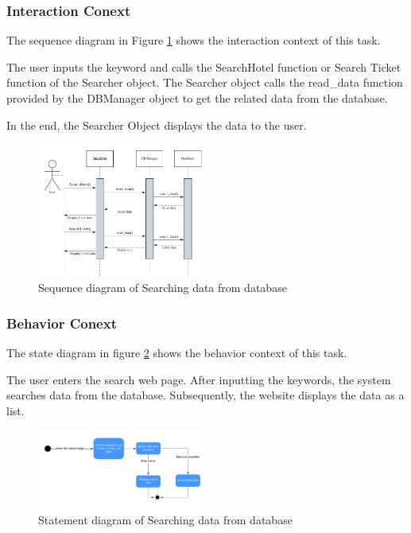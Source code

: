 \documentclass[conference]{IEEEtran}
\begin{document}
\subsubsection{\textbf{Interaction Conext }}
\textbf{}

The sequence diagram in Figure \ref{sequence1} shows the interaction context of this task. 

The user inputs the keyword and calls the SearchHotel function or Search Ticket function of the Searcher object. The Searcher object calls the read\_data function provided by the DBManager object to get the related data from the database.

In the end, the Searcher Object displays the data to the user.
\begin{figure}[htbp]
	\centerline{\includegraphics[width=0.5\textwidth]{image/searching hotel sequence1.pdf}}
	\caption{Sequence diagram of Searching data from database }
	\label{sequence1}
\end{figure}

\subsubsection{\textbf{Behavior Conext }}

\textbf{}

The state diagram in figure \ref{statement1} shows the behavior context of this task. 

The user enters the search web page.  After inputting the keywords, the system searches data from the database. Subsequently, the website displays the data as a list. 

\begin{figure}[htbp]
	\centerline{\includegraphics[width=0.5\textwidth]{image/searching hotel statement1.pdf}}
	\caption{Statement diagram of Searching data from database }
	\label{statement1}
\end{figure}
\end{document}
